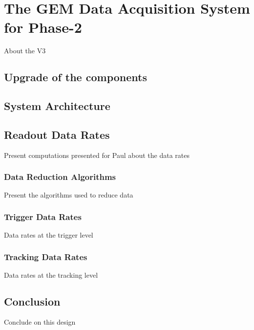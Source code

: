 \chapter{The GEM Data Acquisition System for Phase-2}
\label{chap:gem_daq_phase2}

    About the V3

    \section{Upgrade of the components}

    \section{System Architecture}

    \section{Readout Data Rates}

        Present computations presented for Paul about the data rates

        \subsection{Data Reduction Algorithms}

            Present the algorithms used to reduce data

        \subsection{Trigger Data Rates}

            Data rates at the trigger level

        \subsection{Tracking Data Rates}

            Data rates at the tracking level

    \section{Conclusion}

        Conclude on this design


